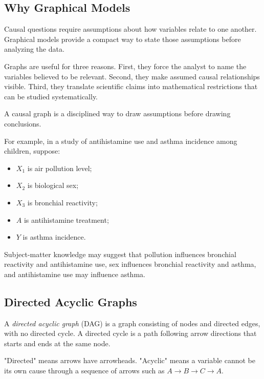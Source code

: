\label{lec:2-3}

\subsection{Why Graphical Models}

Causal questions require assumptions about how variables relate to one another. Graphical models provide a compact way to state those assumptions before analyzing the data.

Graphs are useful for three reasons. First, they force the analyst to name the variables believed to be relevant. Second, they make assumed causal relationships visible. Third, they translate scientific claims into mathematical restrictions that can be studied systematically.

\begin{keyidea}
A causal graph is a disciplined way to draw assumptions before drawing conclusions.
\end{keyidea}

For example, in a study of antihistamine use and asthma incidence among children, suppose:
\begin{itemize}
  \item $X_1$ is air pollution level;
  \item $X_2$ is biological sex;
  \item $X_3$ is bronchial reactivity;
  \item $A$ is antihistamine treatment;
  \item $Y$ is asthma incidence.
\end{itemize}
Subject-matter knowledge may suggest that pollution influences bronchial reactivity and antihistamine use, sex influences bronchial reactivity and asthma, and antihistamine use may influence asthma.

\subsection{Directed Acyclic Graphs}

\begin{definition}
A \emph{directed acyclic graph} (DAG) is a graph consisting of nodes and directed edges, with no directed cycle. A directed cycle is a path following arrow directions that starts and ends at the same node.
\end{definition}

"Directed" means arrows have arrowheads. "Acyclic" means a variable cannot be its own cause through a sequence of arrows such as $A\to B\to C\to A$.

